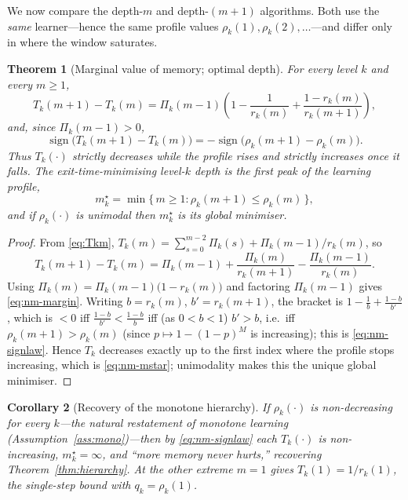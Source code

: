 \documentclass[11pt,a4paper]{article}
\newtheorem{theorem}{Theorem}[section]
\newtheorem{corollary}[theorem]{Corollary}
\begin{document}
We now compare the depth-$m$ and depth-$(m{+}1)$ algorithms.  Both use
the \emph{same} learner---hence the same profile values
$\rho_k(1),\rho_k(2),\dots$---and differ only in where the window
saturates.

\begin{theorem}[Marginal value of memory; optimal depth]\label{thm:nm-margin}
  For every level $k$ and every $m\ge1$,
  \begin{equation}
    T_k(m+1)-T_k(m)
    =\Pi_k(m-1)\left(1-\frac{1}{r_k(m)}+\frac{1-r_k(m)}{r_k(m+1)}\right),
    \label{eq:nm-margin}
  \end{equation}
  and, since $\Pi_k(m-1)>0$,
  \begin{equation}
    \operatorname{sign}\!\bigl(T_k(m+1)-T_k(m)\bigr)
    =-\operatorname{sign}\!\bigl(\rho_k(m+1)-\rho_k(m)\bigr).
    \label{eq:nm-signlaw}
  \end{equation}
  Thus $T_k(\cdot)$ strictly decreases while the profile rises and
  strictly increases once it falls.  The exit-time-minimising level-$k$
  depth is the \emph{first peak of the learning profile},
  \begin{equation}
    m_k^\star=\min\{\,m\ge1 : \rho_k(m+1)\le\rho_k(m)\,\},
    \label{eq:nm-mstar}
  \end{equation}
  and if $\rho_k(\cdot)$ is unimodal then $m_k^\star$ is its global
  minimiser.
\end{theorem}

\begin{proof}
  From \eqref{eq:Tkm},
  $T_k(m)=\sum_{s=0}^{m-2}\Pi_k(s)+\Pi_k(m-1)/r_k(m)$, so
  \[
    T_k(m+1)-T_k(m)
    =\Pi_k(m-1)+\frac{\Pi_k(m)}{r_k(m+1)}-\frac{\Pi_k(m-1)}{r_k(m)} .
  \]
  Using $\Pi_k(m)=\Pi_k(m-1)\bigl(1-r_k(m)\bigr)$ and factoring
  $\Pi_k(m-1)$ gives \eqref{eq:nm-margin}.  Writing $b=r_k(m)$,
  $b'=r_k(m+1)$, the bracket is
  $1-\tfrac1b+\tfrac{1-b}{b'}$, which is $<0$ iff
  $\tfrac{1-b}{b'}<\tfrac{1-b}{b}$ iff (as $0<b<1$) $b'>b$, i.e.\ iff
  $\rho_k(m+1)>\rho_k(m)$ (since $p\mapsto1-(1-p)^M$ is increasing); this
  is \eqref{eq:nm-signlaw}.  Hence $T_k$ decreases exactly up to the
  first index where the profile stops increasing, which is
  \eqref{eq:nm-mstar}; unimodality makes this the unique global
  minimiser.
\end{proof}

\begin{corollary}[Recovery of the monotone hierarchy]\label{cor:nm-recover}
  If $\rho_k(\cdot)$ is non-decreasing for every $k$---the natural
  restatement of monotone learning (Assumption~\ref{ass:mono})---then by
  \eqref{eq:nm-signlaw} each $T_k(\cdot)$ is non-increasing, $m_k^\star=\infty$,
  and ``more memory never hurts,'' recovering Theorem~\ref{thm:hierarchy}.  At
  the other extreme $m=1$ gives $T_k(1)=1/r_k(1)$, the single-step bound
  with $q_k=\rho_k(1)$.
\end{corollary}
\end{document}
